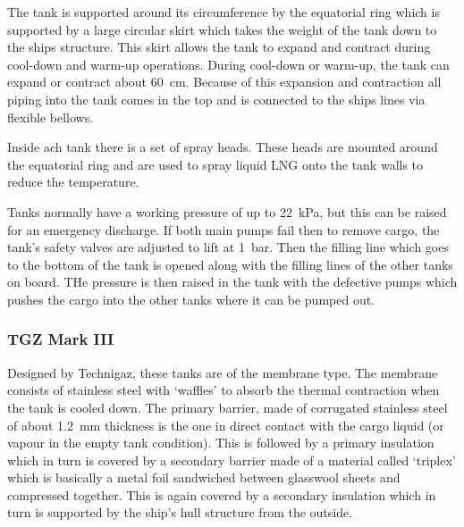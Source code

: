 The tank is supported around its circumference by the equatorial ring which is supported by a large circular skirt which takes the weight of the tank down to the ships structure. This skirt allows the tank to expand and contract during cool-down and warm-up operations. During cool-down or warm-up, the tank can expand or contract about \SI{60}{\centi\meter}. Because of this expansion and contraction all piping into the tank comes in the top and is connected to the ships lines via flexible bellows. 

Inside ach tank there is a set of spray heads. These heads are mounted around the equatorial ring and are used to spray liquid LNG onto the tank walls to reduce the temperature. 

Tanks normally have a working pressure of up to \SI{22}{\kilo\pascal}, but this can be raised for an emergency discharge. If both main pumps fail then to remove cargo, the tank's safety valves are adjusted to lift at \SI{1}{bar}. Then the filling line which goes to the bottom of the tank is opened along with the filling lines of the other tanks on board. THe pressure is then raised in the tank with the defective pumps which pushes the cargo into the other tanks where it can be pumped out.
\subsubsection{TGZ Mark III}
Designed by Technigaz, these tanks are of the membrane type. The membrane consists of stainless steel with `waffles' to absorb the thermal contraction when the tank is cooled down. The primary barrier, made of corrugated stainless steel of about \SI{1.2}{\milli\meter} thickness is the one in direct contact with the cargo liquid (or vapour in the empty tank condition). This is followed by a primary insulation which in turn is covered by a secondary barrier made of a material called `triplex' which is basically a metal foil sandwiched between glasswool sheets and compressed together. This is again covered by a secondary insulation which in turn is supported by the ship's hull structure from the outside. 

